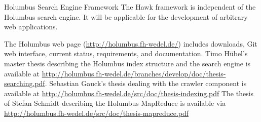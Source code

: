 \begin{hcarentry}[updated]{Holumbus Search Engine Framework}
The Hawk framework is independent of the Holumbus search engine.
It will be applicable for the development of arbitrary web applications.

\FurtherReading

The Holumbus web page
(\url{http://holumbus.fh-wedel.de/})
includes downloads, Git web interface, current status, requirements, 
and documentation.
Timo H\"ubel's master thesis describing the Holumbus index structure and
the search engine is available at
\url{http://holumbus.fh-wedel.de/branches/develop/doc/thesis-searching.pdf}.
Sebastian Gauck's  thesis dealing with the crawler component is
available at
\url{http://holumbus.fh-wedel.de/src/doc/thesis-indexing.pdf}
The thesis of Stefan Schmidt describing the Holumbus MapReduce is
available via \url{http://holumbus.fh-wedel.de/src/doc/thesis-mapreduce.pdf}
\end{hcarentry}
